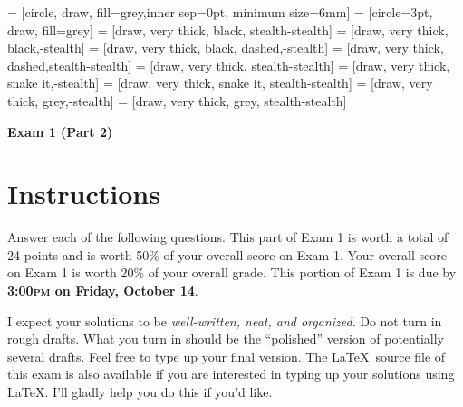 \documentclass[11pt]{article}
\theoremstyle{definition}
\begin{document}
 = [circle, draw, fill=grey,inner sep=0pt, minimum size=6mm]
 = [circle=3pt, draw, fill=grey]
 = [draw, very  thick, black, stealth-stealth]
 = [draw, very  thick, black,-stealth]
 = [draw, very  thick, black, dashed,-stealth]
 = [draw, very thick, dashed,stealth-stealth]
 = [draw, very thick, stealth-stealth]
 = [draw, very thick, snake it,-stealth]
 = [draw, very thick, snake it, stealth-stealth]
 = [draw, very thick, grey,-stealth]
 = [draw, very thick, grey, stealth-stealth]

\begin{center}

{\Large\bf Exam 1 (Part 2)}

\bigskip

  
  \bigskip
  

\end{center}

\section*{Instructions}

Answer each of the following questions. This part of Exam 1 is worth a total of 24 points and is worth 50\% of your overall score on Exam 1. Your overall score on Exam 1 is worth 20\% of your overall grade. This portion of Exam 1 is due by \textbf{3:00\textsc{pm} on Friday, October 14}.

\bigskip

I expect your solutions to be \emph{well-written, neat, and organized}.  Do not turn in rough drafts.  What you turn in should be the ``polished'' version of potentially several drafts.  Feel free to type up your final version.  The \LaTeX\ source file of this exam is also available if you are interested in typing up your solutions using \LaTeX.  I'll gladly help you do this if you'd like.

\bigskip
\end{document}
